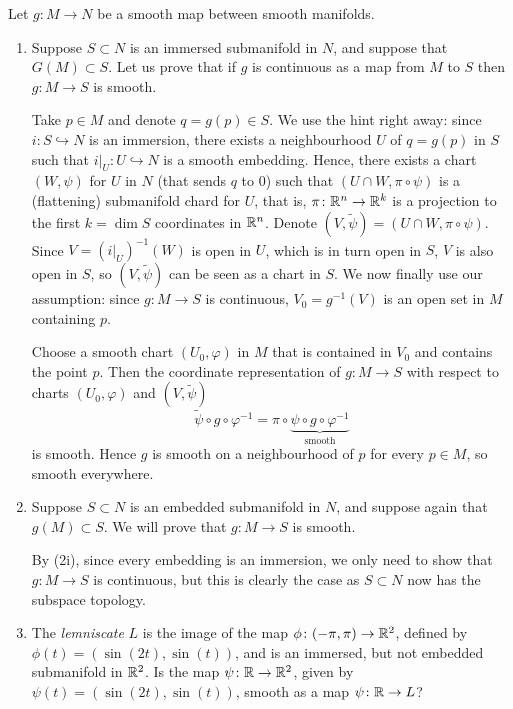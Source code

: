 \documentclass[a4paper, 12pt]{article}
\begin{document}
\begin{Exercise}
    Let $g \colon M \to N$ be a smooth map between smooth manifolds.
    \begin{enumerate}[label=(\roman*)]
        \item
            Suppose $S \subset N$ is an immersed submanifold in $N$, and suppose that $G(M) \subset S$.
            Let us prove that if $g$ is continuous as a map from $M$ to $S$ then $g \colon M \to S$ is smooth.

            Take $p \in M$ and denote $q = g(p) \in S$.
            We use the hint right away: since $i \colon S \hookrightarrow N$ is an immersion,
            there exists a neighbourhood $U$ of $q = g(p)$ in $S$ such that $i|_U \colon U \hookrightarrow N$ is a smooth embedding.
            Hence, there exists a chart $(W, \psi)$ for $U$ in $N$ (that sends $q$ to $0$) such that $(U \cap W, \pi\circ\psi)$ is a (flattening) submanifold chard for $U$,
            that is, $\pi\colon \mathbb{R}^n \to \mathbb{R}^k$ is a projection to the first $k = \dim S$ coordinates in $\mathbb{R}^n$.
            Denote $(V, \tilde{\psi}) = (U \cap W, \pi\circ\psi)$.
            Since $V = (i|_U)^{-1}(W)$ is open in $U$, which is in turn open in $S$, $V$ is also open in $S$,
            so $(V, \tilde{\psi})$ can be seen as a chart in $S$.
            We now finally use our assumption: since $g \colon M \to S$ is continuous,
            $V_0 = g^{-1}(V)$ is an open set in $M$ containing $p$.

            Choose a smooth chart $(U_0, \varphi)$ in $M$ that is contained in $V_0$ and contains the point $p$.
            Then the coordinate representation of $g \colon M \to S$ with respect to charts $(U_0, \varphi)$ and $(V, \tilde{\psi})$
            \[
                \tilde{\psi} \circ g \circ \varphi^{-1} = \pi \circ \underbrace{\psi \circ g \circ \varphi^{-1}}_{\text{smooth}}
            \]
            is smooth. Hence $g$ is smooth on a neighbourhood of $p$ for every $p \in M$, so smooth everywhere.
        \item
            Suppose $S \subset N$ is an embedded submanifold in $N$, and suppose again that $g(M) \subset S$.
            We will prove that $g \colon M \to S$ is smooth.

            By (2i), since every embedding is an immersion, we only need to show that $g \colon M \to S$ is continuous,
            but this is clearly the case as $S \subset N$ now has the subspace topology.
        \item
            The \emph{lemniscate} $L$ is the image of the map $\phi \colon (-\pi, \pi) \to \mathbb{R}^2$,
            defined by $\phi(t) = (\sin(2t), \sin(t))$,
            and is an immersed, but not embedded submanifold in $\mathbb{R}^2$.
            Is the map $\psi \colon \mathbb{R} \to \mathbb{R}^2$, given by $\psi(t) = (\sin(2t), \sin(t))$,
            smooth as a map $\psi \colon \mathbb{R} \to L$?


\end{enumerate}
\end{Exercise}
\end{document}
